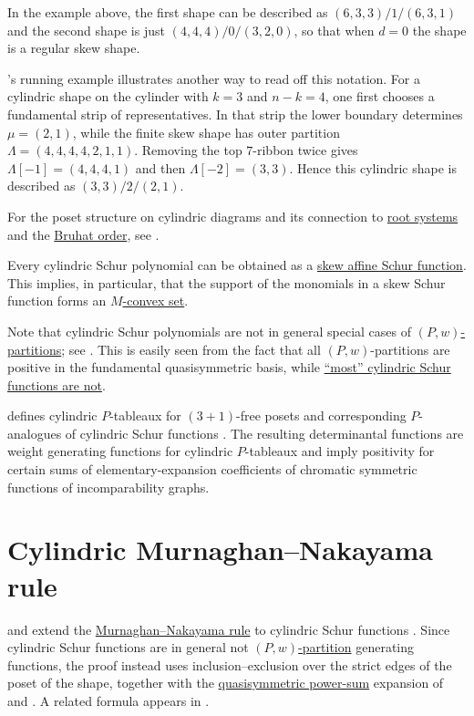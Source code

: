 In the example above, the first shape can be described as $(6,3,3)/1/(6,3,1)$
and the second shape is just $(4,4,4)/0/(3,2,0)$, so that when $d=0$
the shape is a regular skew shape.

's running example \cite[p.~12]{McNamara2006}
illustrates another way to read off this notation.  For a cylindric shape on the
cylinder with $k=3$ and $n-k=4$, one first chooses a fundamental strip of
representatives.  In that strip the lower boundary determines
$\mu=(2,1)$, while the finite skew shape has outer partition
$\Lambda=(4,4,4,4,2,1,1)$.  Removing the top $7$-ribbon twice gives
$\Lambda[-1]=(4,4,4,1)$ and then $\Lambda[-2]=(3,3)$.  Hence this
cylindric shape is described as $(3,3)/2/(2,1)$.

For the poset structure on cylindric diagrams and its connection
to \hyperref[rootSystem]{root systems} and the \hyperref[bruhatOrder]{Bruhat order},
see \cite{NakadaSuzukiToyosawa2023x}.


Every cylindric Schur polynomial can be obtained as a
\hyperref[schurAffineSkew]{skew affine Schur function}.
This implies, in particular, that the support of the monomials in a skew Schur
function forms an \hyperref[MConvexity]{$M$-convex set}.

Note that cylindric Schur polynomials are not in general special cases of
\hyperref[pPartitionDefinition]{$(P,w)$-partitions}; see
\cite{McNamara2006}.  This is easily seen from the fact that all
$(P,w)$-partitions are positive in the fundamental quasisymmetric basis, while
\hyperref[cylindricSchurPositivity]{\enquote{most} cylindric Schur functions
are not}.

 defines cylindric $P$-tableaux for $(3+1)$-free posets
and corresponding $P$-analogues of cylindric Schur functions
\cite{Siegl2025}.  The resulting determinantal functions are weight
generating functions for cylindric $P$-tableaux and imply positivity for
certain sums of elementary-expansion coefficients of chromatic symmetric
functions of incomparability graphs.


\section[cylindricMurnaghanNakayama]{Cylindric Murnaghan--Nakayama rule}

 and  extend the
\hyperref[murnaghanNakayamaRule]{Murnaghan--Nakayama rule} to cylindric Schur
functions \cite{AlexanderssonOguz2023x}.  Since cylindric Schur functions are
in general not \hyperref[pPartitionDefinition]{$(P,w)$-partition} generating
functions, the proof instead uses inclusion--exclusion over the strict edges
of the poset of the shape, together with the
\hyperref[quasisymmetricPowerSumPsi]{quasisymmetric power-sum} expansion of
 and 
\cite[Thm.~6.2]{AlexanderssonSulzgruber2019}.  A related formula
appears in \cite[Eq.~(145)]{KorffPalazzo2020}.

